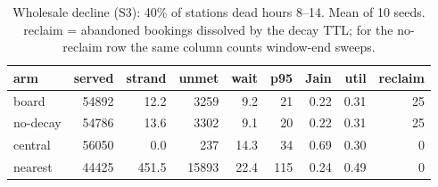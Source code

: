 \begin{table}
\centering
\caption{Wholesale decline (S3): 40\% of stations dead hours 8--14.  Mean of 10 seeds.  reclaim = abandoned bookings
dissolved by the decay TTL; for the no-reclaim row the same column
counts window-end sweeps.}
\label{tab:e3out}
\begin{tabular}{@{}lrrrrrrrr@{}}
\toprule
arm & served & strand & unmet & wait & p95 & Jain & util & reclaim \\
\midrule
board & 54892 & 12.2 & 3259 & 9.2 & 21 & 0.22 & 0.31 & 25 \\
no-decay & 54786 & 13.6 & 3302 & 9.1 & 20 & 0.22 & 0.31 & 25 \\
central & 56050 & 0.0 & 237 & 14.3 & 34 & 0.69 & 0.30 & 0 \\
nearest & 44425 & 451.5 & 15893 & 22.4 & 115 & 0.24 & 0.49 & 0 \\
\bottomrule
\end{tabular}
\end{table}

